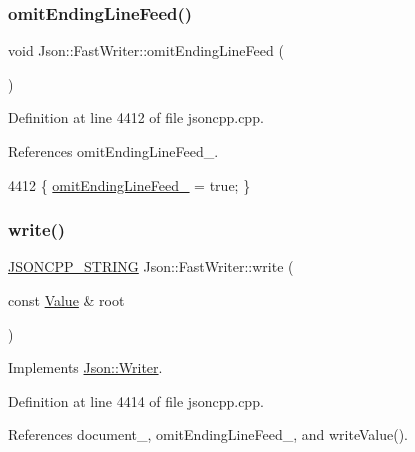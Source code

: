 \subsubsection{\texorpdfstring{omit\+Ending\+Line\+Feed()}{omitEndingLineFeed()}}
{\footnotesize\ttfamily void Json\+::\+Fast\+Writer\+::omit\+Ending\+Line\+Feed (\begin{DoxyParamCaption}{ }\end{DoxyParamCaption})}



Definition at line 4412 of file jsoncpp.\+cpp.



References omit\+Ending\+Line\+Feed\+\_\+.


\begin{DoxyCode}
4412 \{ \hyperlink{class_json_1_1_fast_writer_abd6e13851db6dcf59d84af68d48d50ac}{omitEndingLineFeed\_} = \textcolor{keyword}{true}; \}
\end{DoxyCode}
\mbox{\label{class_json_1_1_fast_writer_a93d45ba4bc312371d08beb3e3dfbe654}} 
\subsubsection{\texorpdfstring{write()}{write()}}
{\footnotesize\ttfamily \hyperlink{json_8h_a1e723f95759de062585bc4a8fd3fa4be}{J\+S\+O\+N\+C\+P\+P\+\_\+\+S\+T\+R\+I\+NG} Json\+::\+Fast\+Writer\+::write (\begin{DoxyParamCaption}\item[{const \hyperlink{class_json_1_1_value}{Value} \&}]{root }\end{DoxyParamCaption})\hspace{0.3cm}{\ttfamily [virtual]}}



Implements \hyperlink{class_json_1_1_writer_a61c55882b82c7651d0b9b683c6d3f371}{Json\+::\+Writer}.



Definition at line 4414 of file jsoncpp.\+cpp.



References document\+\_\+, omit\+Ending\+Line\+Feed\+\_\+, and write\+Value().


